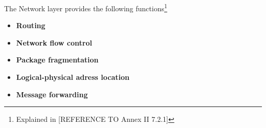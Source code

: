 %
%
%
%
%
%
%

The Network layer provides the following functions\footnote{Explained in [REFERENCE TO Annex II 7.2.1]}
\begin{itemize}
\item \textbf{Routing}
\item \textbf{Network flow control}
\item \textbf{Package fragmentation}
\item \textbf{Logical-physical adress location}
\item \textbf{Message forwarding}
\end{itemize}


